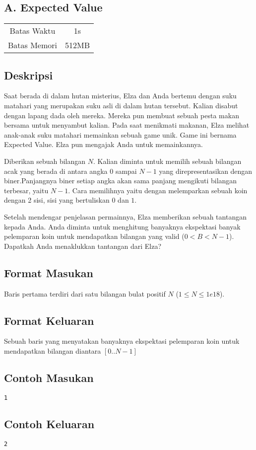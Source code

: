 \documentclass{article}
\begin{document}
\begin{center}
    \section*{A. Expected Value} %

    \begin{tabular}{ | c c | }
        \hline
        Batas Waktu  & 1s \\    %
        Batas Memori & 512MB \\  %
        \hline
    \end{tabular}
\end{center}

\subsection*{Deskripsi}
Saat berada di dalam hutan misterius, Elza dan Anda bertemu dengan suku matahari yang merupakan suku asli di dalam hutan tersebut.
Kalian disabut dengan lapang dada oleh mereka. Mereka pun membuat sebuah pesta makan bersama untuk menyambut kalian.
Pada saat menikmati makanan, Elza melihat anak-anak suku matahari memainkan sebuah game unik. Game ini bernama Expected Value. Elza pun
mengajak Anda untuk memainkannya.

Diberikan sebuah bilangan $N$. Kalian diminta untuk memilih sebuah bilangan acak yang berada di antara angka $0$ sampai $N-1$ yang 
direpresentasikan dengan biner.Panjangnya biner setiap angka akan sama panjang mengikuti bilangan terbesar, yaitu $N-1$.
Cara memilihnya yaitu dengan melemparkan sebuah koin dengan 2 sisi, sisi yang bertuliskan $0$ dan $1$.

Setelah mendengar penjelasan permainnya, Elza memberikan sebuah tantangan kepada Anda. Anda diminta untuk menghitung banyaknya 
ekspektasi banyak pelemparan koin untuk mendapatkan bilangan yang valid ($0 < B < N-1$). Dapatkah Anda menaklukkan tantangan dari Elza?

\subsection*{Format Masukan}
Baris pertama terdiri dari satu bilangan bulat positif $N$ ($1 \leq N \leq 1e18$).

\subsection*{Format Keluaran}
Sebuah baris yang menyatakan banyaknya ekspektasi pelemparan koin untuk mendapatkan bilangan diantara $[0..N-1]$
\\

\begin{multicols}{2}
\subsection*{Contoh Masukan}
\begin{lstlisting}
1
\end{lstlisting}
\columnbreak
\subsection*{Contoh Keluaran}
\begin{lstlisting}
2
\end{lstlisting}
\vfill
\null
\end{multicols}


\pagebreak
\end{document}
